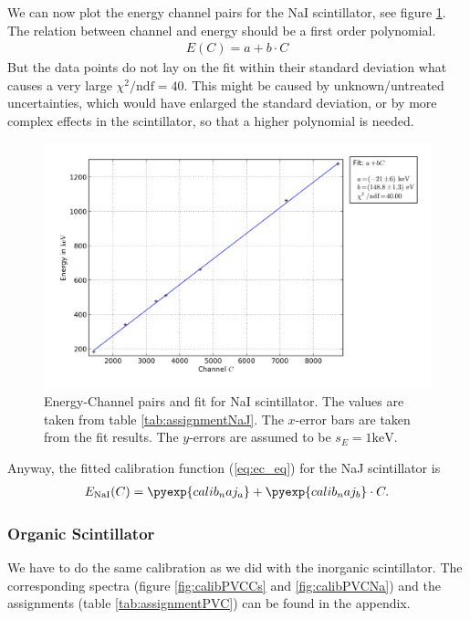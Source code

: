 We can now plot the energy channel pairs for the NaI scintillator, see
figure \ref{fig:calibNaJ}. The relation between channel and energy should be
a first order polynomial.
\begin{align}
  E(C) = a + b \cdot C \label{eq:ec_eq}
\end{align}
But the data points do not lay on the fit within their standard deviation
what causes a very large $\chi^2/\mathrm{ndf} = 40$. This might be caused
by unknown/untreated uncertainties, which would have enlarged the standard
deviation, or by more complex effects in the scintillator, so that a higher
polynomial is needed.

\begin{figure}[tbp]
  \centering
  \includegraphics[width=1.0\textwidth]{plots/calib_naj.png}
  \caption{Energy-Channel pairs and fit for NaI scintillator. The values are
  taken from table \ref{tab:assignmentNaJ}. The $x$-error bars are taken
  from the fit results.  The $y$-errors are assumed to be $s_E =
  1\mathrm{keV}$.}
   \label{fig:calibNaJ}
\end{figure}

Anyway, the fitted calibration function (\ref{eq:ec_eq}) for the NaJ
scintillator is
\begin{align}
  E_{\mathrm{NaI}}(C) = \pyexp{calib_naj_a} + \pyexp{calib_naj_b} \cdot C.
  \label{eq:calib_naj}
\end{align}

\subsubsection{Organic Scintillator}
We have to do the same calibration as we did with the inorganic
scintillator. The corresponding spectra (figure \ref{fig:calibPVCCs} and
\ref{fig:calibPVCNa}) and the assignments (table \ref{tab:assignmentPVC}) can be
found in the appendix.

